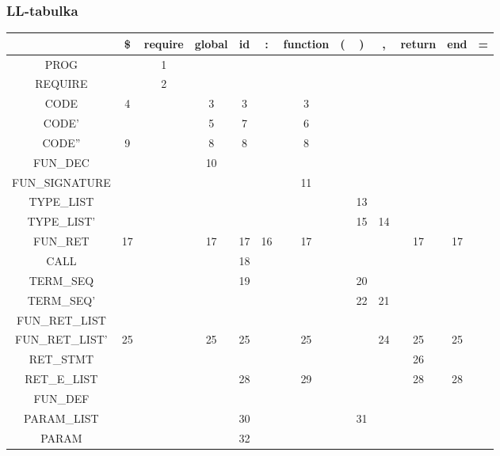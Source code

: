 \documentclass[11pt,a4paper]{article}
\begin{document}
        \subsubsection{LL-tabulka}
        \begin{table}[ht!]
        \begin{tabular}{|c|c|c|c|c|c|c|c|c|c|c|c|l|}
        \hline
         & \$ & require & global & id & : & function & ( & ) & , & return & end & = \\ \hline
        PROG &  & 1 &  &  &  &  &  &  &  &  &  &  \\ \hline
        REQUIRE &  & 2 &  &  &  &  &  &  &  &  &  &  \\ \hline
        CODE & 4 &  & 3 & 3 &  & 3 &  &  &  &  &  &  \\ \hline
        CODE' &  &  & 5 & 7 &  & 6 &  &  &  &  &  &  \\ \hline
        CODE'' & 9 &  & 8 & 8 &  & 8 &  &  &  &  &  &  \\ \hline
        FUN\_DEC &  &  & 10 &  &  &  &  &  &  &  &  &  \\ \hline
        FUN\_SIGNATURE &  &  &  &  &  & 11 &  &  &  &  &  &  \\ \hline
        TYPE\_LIST &  &  &  &  &  &  &  & 13 &  &  &  &  \\ \hline
        TYPE\_LIST' &  &  &  &  &  &  &  & 15 & 14 &  &  &  \\ \hline
        FUN\_RET & 17 &  & 17 & 17 & 16 & 17 &  &  &  & 17 & 17 &  \\ \hline
        CALL &  &  &  & 18 &  &  &  &  &  &  &  &  \\ \hline
        TERM\_SEQ &  &  &  & 19 &  &  &  & 20 &  &  &  &  \\ \hline
        TERM\_SEQ' &  &  &  &  &  &  &  & 22 & 21 &  &  &  \\ \hline
        FUN\_RET\_LIST &  &  &  &  &  &  &  &  &  &  &  &  \\ \hline
        FUN\_RET\_LIST' & 25 &  & 25 & 25 &  & 25 &  &  & 24 & 25 & 25 &  \\ \hline
        RET\_STMT &  &  &  &  &  &  &  &  &  & 26 &  &  \\ \hline
        RET\_E\_LIST &  &  &  & 28 &  & 29 &  &  &  & 28 & 28 &  \\ \hline
        FUN\_DEF &  &  &  &  &  &  &  &  &  &  &  &  \\ \hline
        PARAM\_LIST &  &  &  & 30 &  &  &  & 31 &  &  &  &  \\ \hline
        PARAM &  &  &  & 32 &  &  &  &  &  &  &  &  \\ \hline

\end{tabular}
\end{table}
\end{document}
